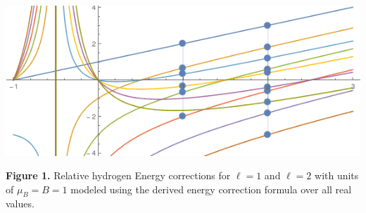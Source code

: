 \begin{center}
	\includegraphics[scale=0.75]{./chapters/electromagnetism/images/Energy levels_trimmed.png}
	
	{\footnotesize \textbf{Figure 1.} Relative hydrogen Energy corrections for $\ell=1$ and $\ell=2$ with units of $\mu_B=B=1$ modeled using the derived energy correction formula over all real values.}
\end{center}